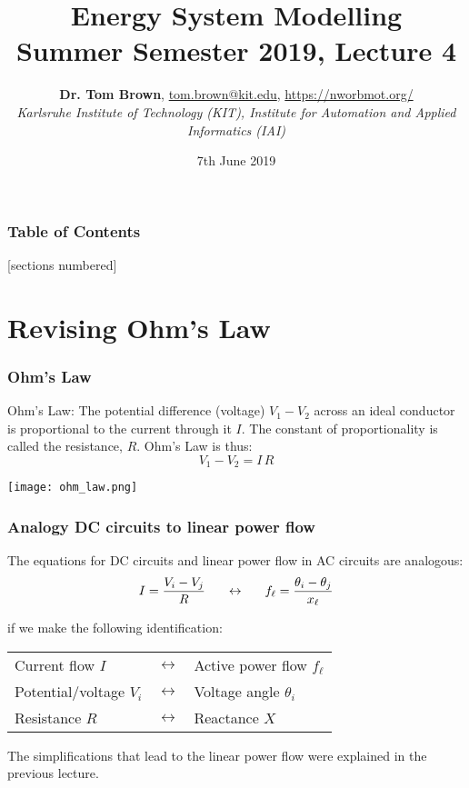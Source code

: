 \documentclass[10pt,dvipsnames]{beamer}
\title{Energy System Modelling\\ Summer Semester 2019, Lecture 4}
\author{
  {\bf Dr. Tom Brown}, \href{mailto:tom.brown@kit.edu}{tom.brown@kit.edu}, \url{https://nworbmot.org/}\\
  \emph{Karlsruhe Institute of Technology (KIT), Institute for Automation and Applied Informatics (IAI)}
}
\date{\vspace{.3cm}7th June 2019}
\newcommand{\ra}[1]{\renewcommand{\arraystretch}{#1}}
\begin{document}
\maketitle


\begin{frame}

  \frametitle{Table of Contents}
  [sections numbered]
  \tableofcontents[hideallsubsections]
\end{frame}


\section{Revising Ohm's Law}

\begin{frame}
  \frametitle{Ohm's Law}

  \alert{Ohm's Law}: The potential difference (voltage) $V_1 - V_2$ across an ideal conductor is proportional to the current through it $I$. The constant of proportionality is called the \alert{resistance}, $R$. Ohm's Law is thus:
  \begin{equation*}
     V_1 - V_2 = I\,R
  \end{equation*}

  \centering
  \texttt{[image: ohm\_law.png]}


\end{frame}

\begin{frame}
  \frametitle{Analogy DC circuits to linear power flow}

  The equations for DC circuits and linear power flow in AC circuits are analogous:
  \begin{equation*}
    I = \frac{V_i - V_j}{R} \hspace{.55cm} \leftrightarrow \hspace{.55cm} f_\ell =  \frac{\theta_i - \theta_j}{x_\ell}
  \end{equation*}

  if we make the following identification:
    \ra{1.05}
  \begin{table}[!t]
    \begin{tabular}{p{4cm}p{0.5cm}p{4cm}}
      \toprule
      Current flow $I$ & $\leftrightarrow$  &  Active power flow $f_\ell$ \\
      Potential/voltage $V_i$ & $\leftrightarrow$  &  Voltage angle $\theta_i$ \\
      Resistance $R$ & $\leftrightarrow$  &  Reactance $X$ \\
      \bottomrule
    \end{tabular}
  \end{table}

  The simplifications that lead to the linear power flow were explained in the previous lecture.

\end{frame}
\end{document}
